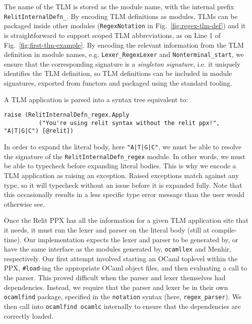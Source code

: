 \documentclass[acmsmall]{acmart}
\newcommand{\li}[1]{\lstinline[basicstyle=\ttfamily\fontsize{9pt}{1em}\selectfont]{#1}}
\theoremstyle{slplain}
\numberwithin{thm}{section}
\begin{document}
The name of the TLM is stored as the module name, with the internal prefix \li{RelitInternalDefn_}. By encoding TLM definitions as modules, TLMs can be packaged inside other modules (\li{RegexNotation} in Fig.~\ref{fig:regex-tlm-def}) and it is straightforward to support scoped TLM abbreviations, as on Line 1 of Fig.~\ref{fig:first-tlm-example}. By encoding the relevant information from the TLM definition in module names, e.g. \li{Lexer_RegexLexer} and \li{Nonterminal_start}, we ensure that the corresponding signature is a \emph{singleton signature}, i.e. it uniquely identifies the TLM definition, so TLM definitions can be included in module signatures, exported from functors and packaged using the standard tooling.

A TLM application is parsed into a syntax tree equivalent to:
\begin{lstlisting}[numbers=none]
  raise (RelitInternalDefn_regex.Apply
          ("You're using relit syntax without the relit ppx!", "A|T|G|C") [@relit])
\end{lstlisting}

In order to expand the literal body, here \li{"A|T|G|C"}, we must be able to resolve the signature of the \li{RelitInternalDefn_regex} module. In other words, we must be able to typecheck before expanding literal bodies. This is why we encode a TLM application as raising an exception. Raised exceptions match against any type, so it will typecheck without an issue before it is expanded fully. Note that this occasionally results in a less specific type error message than the user would otherwise see. 

Once the Relit PPX has all the information for a given TLM application site that it needs, it must run the lexer and parser on the literal body (still at compile-time).  Our implementation expects the lexer and parser to be generated by, or have the same interface as the modules generated by, \li{ocamllex} and Menhir, respectively. Our first attempt involved starting an OCaml toplevel within the PPX, \li{#load}-ing the appropriate OCaml object files, and then evaluating a call to the parser. This proved difficult when the parser and lexer themselves had dependencies. Instead, we require that the parser and lexer be in their own \li{ocamlfind} package, specified in the \li{notation} syntax (here, \li{regex_parser}). We then call into \li{ocamlfind ocamlc} internally to ensure that the dependencies are correctly loaded.
\end{document}
